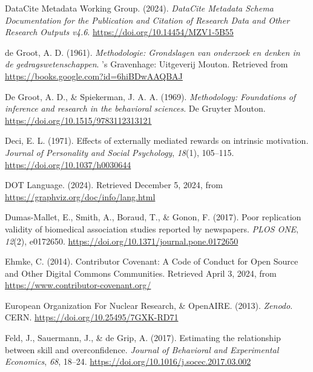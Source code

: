 \documentclass[
  man, noextraspace,floatsintext]{apa6}
\newlength{\cslhangindent}
\newenvironment{CSLReferences}[2] %
 {\begin{list}{}{%
  \setlength{\itemindent}{0pt}
  \setlength{\leftmargin}{0pt}
  \setlength{\parsep}{0pt}
  \ifodd #1
   \setlength{\leftmargin}{\cslhangindent}
   \setlength{\itemindent}{-1\cslhangindent}
  \fi
  \setlength{\itemsep}{#2\baselineskip}}}
 {\end{list}}
\begin{document}
\begin{CSLReferences}{1}{0}
DataCite Metadata Working Group. (2024). \emph{{DataCite Metadata Schema Documentation} for the {Publication} and {Citation} of {Research Data} and {Other Research Outputs} v4.6}. \url{https://doi.org/10.14454/MZV1-5B55}

de Groot, A. D. (1961). \emph{Methodologie: Grondslagen van onderzoek en denken in de gedragswetenschappen}. 's Gravenhage: Uitgeverij Mouton. Retrieved from \url{https://books.google.com?id=6hiBDwAAQBAJ}

De Groot, A. D., \& Spiekerman, J. A. A. (1969). \emph{Methodology: {Foundations} of inference and research in the behavioral sciences}. De Gruyter Mouton. \url{https://doi.org/10.1515/9783112313121}

Deci, E. L. (1971). Effects of externally mediated rewards on intrinsic motivation. \emph{Journal of Personality and Social Psychology}, \emph{18}(1), 105--115. \url{https://doi.org/10.1037/h0030644}

{DOT Language}. (2024). Retrieved December 5, 2024, from \url{https://graphviz.org/doc/info/lang.html}

Dumas-Mallet, E., Smith, A., Boraud, T., \& Gonon, F. (2017). Poor replication validity of biomedical association studies reported by newspapers. \emph{PLOS ONE}, \emph{12}(2), e0172650. \url{https://doi.org/10.1371/journal.pone.0172650}

Ehmke, C. (2014). Contributor {Covenant}: {A Code} of {Conduct} for {Open Source} and {Other Digital Commons Communities}. Retrieved April 3, 2024, from \url{https://www.contributor-covenant.org/}

European Organization For Nuclear Research, \& OpenAIRE. (2013). \emph{Zenodo}. CERN. \url{https://doi.org/10.25495/7GXK-RD71}

Feld, J., Sauermann, J., \& de Grip, A. (2017). Estimating the relationship between skill and overconfidence. \emph{Journal of Behavioral and Experimental Economics}, \emph{68}, 18--24. \url{https://doi.org/10.1016/j.socec.2017.03.002}


\end{CSLReferences}
\end{document}
